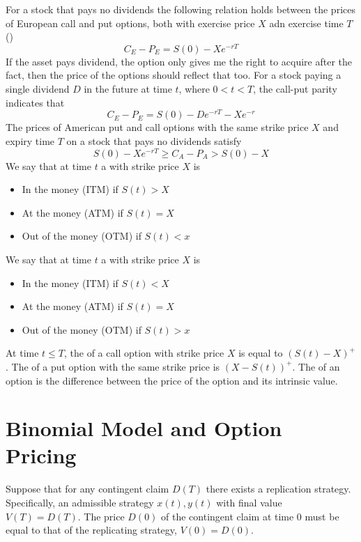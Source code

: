 \documentclass{article}
\begin{document}
For a stock that pays no dividends the following relation holds between the prices of European call and put options, both with exercise price $X$ adn exercise time $T$ () $$C_E - P_E = S(0) - Xe^{-rT}$$ If the asset pays dividend, the option only gives me the right to acquire after the fact, then the price of the options should reflect that too. For a stock paying a single dividend $D$ in the future at time $t$, where $0 < t < T$, the call-put parity indicates that $$C_E - P_E = S(0) - De^{-rT} - Xe^{-r}$$ The prices of American put and call options with the same strike price $X$ and expiry time $T$ on a stock that pays no dividends satisfy $$S(0) - Xe^{-rT} \geq C_A - P_A > S(0) - X$$ We say that at time $t$ a  with strike price $X$ is 
\begin{itemize}
  \item In the money (ITM) if $S(t) > X$ 
  \item At the money (ATM) if $S(t) = X$ 
  \item Out of the money (OTM) if $S(t) < x$
\end{itemize}
We say that at time $t$ a  with strike price $X$ is 
\begin{itemize}
  \item In the money (ITM) if $S(t) < X$ 
  \item At the money (ATM) if $S(t) = X$ 
  \item Out of the money (OTM) if $S(t) > x$
\end{itemize}
At time $t \leq T$, the  of a call option with strike price $X$ is equal to $(S(t) - X)^+$. The  of a put option with the same strike price is $(X - S(t))^+$. The  of an option is the difference between the price of the option and its intrinsic value. 

\section{Binomial Model and Option Pricing}

Suppose that for any contingent claim $D(T)$ there exists a replication strategy. Specifically, an admissible strategy $x(t), y(t)$ with final value $V(T) = D(T)$. The price $D(0)$ of the contingent claim at time 0 must be equal to that of the replicating strategy, $V(0) = D(0)$. \\ 
\end{document}
